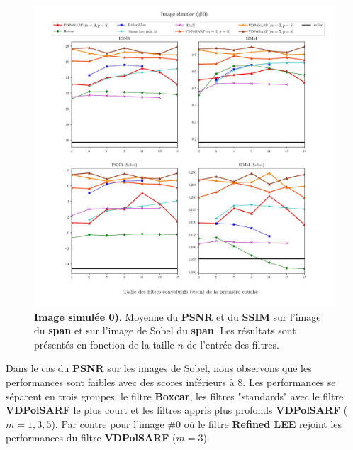 \begin{figure}[!htbp] 
\includegraphics[width=1.0\textwidth]{figures/Chap4/results/analyse_multi_sigs/psnr/img_multipolsar_000_noised.jpg}
 \centering
  \caption{
  \footnotesize{  \textbf{Image simulée 0)}. Moyenne du \textbf{PSNR} et du \textbf{SSIM} sur l'image du \textbf{span} et sur l'image de Sobel du \textbf{span}.  Les résultats sont présentés en fonction de la taille $n$ de l'entrée des filtres.
  }
  }
  \label{fig:filter_psnr_0}
\end{figure}

Dans le cas du \textbf{PSNR} sur les images de Sobel, nous observons que les performances sont faibles avec des scores inférieurs à 8.  Les performances se séparent en trois groupes: le filtre \textbf{Boxcar}, les filtres "standards" avec le filtre \textbf{VDPolSARF} le plus court et les filtres appris plus profonds \textbf{VDPolSARF} ($m=1,3,5$).  Par contre pour l'image \#0 où le filtre \textbf{Refined LEE} rejoint les performances du filtre  \textbf{VDPolSARF} ($m=3$).

